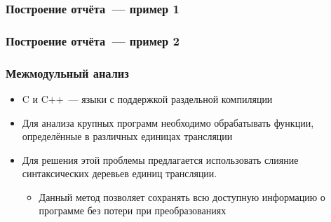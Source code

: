 \documentclass[14pt]{beamer}
\begin{document}
\begin{frame}
\frametitle{Построение отчёта~--- пример 1}
\begin{figure}[H]
\end{figure}
\end{frame}

\begin{frame}
\frametitle{Построение отчёта~--- пример 2}
\begin{figure}[h]
\end{figure}
\end{frame}

\begin{frame}
\frametitle{Межмодульный анализ}
\begin{itemize}
  \item C и C++~--- языки с поддержкой раздельной компиляции
  \item Для анализа крупных программ необходимо обрабатывать функции, определённые в различных единицах трансляции
  \item Для решения этой проблемы предлагается использовать слияние синтаксических деревьев единиц трансляции.
    \begin{itemize}
      \item Данный метод позволяет сохранять всю доступную информацию о программе без потери при преобразованиях
    \end{itemize}
\end{itemize}
\end{frame}
\end{document}
